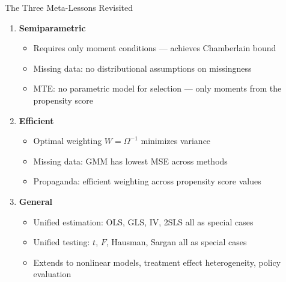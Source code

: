 \documentclass[aspectratio=169, handout]{beamer}
\numberwithin{equation}{section}
\begin{document}
\begin{frame}{The Three Meta-Lessons Revisited}

\begin{enumerate}
\item \textbf{Semiparametric}
\begin{itemize}
\item Requires only moment conditions --- achieves Chamberlain bound
\item Missing data: no distributional assumptions on missingness
\item MTE: no parametric model for selection --- only moments from the propensity score
\end{itemize}

\smallskip
\item \textbf{Efficient}
\begin{itemize}
\item Optimal weighting $W = \Omega^{-1}$ minimizes variance
\item Missing data: GMM has lowest MSE across methods
\item Propaganda: efficient weighting across propensity score values
\end{itemize}

\smallskip
\item \textbf{General}
\begin{itemize}
\item Unified estimation: OLS, GLS, IV, 2SLS all as special cases
\item Unified testing: $t$, $F$, Hausman, Sargan all as special cases
\item Extends to nonlinear models, treatment effect heterogeneity, policy evaluation
\end{itemize}
\end{enumerate}

\end{frame}
\end{document}
